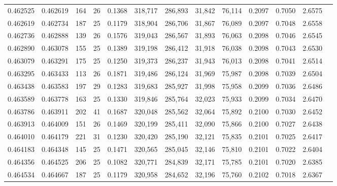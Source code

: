 \begin{tabular}{rrrrrrrrrrrrr}
0.462525 & 0.462619 &   164 &  26 &                                     0.1368 & 318,717 & 286,893 &  31,842 &  76,114 & 0.2097 & 0.7050 & 2.6575 \\
0.462619 & 0.462734 &   187 &  25 &                                     0.1179 & 318,904 & 286,706 &  31,867 &  76,089 & 0.2097 & 0.7048 & 2.6558 \\
0.462736 & 0.462888 &   139 &  26 &                                     0.1576 & 319,043 & 286,567 &  31,893 &  76,063 & 0.2098 & 0.7046 & 2.6545 \\
0.462890 & 0.463078 &   155 &  25 &                                     0.1389 & 319,198 & 286,412 &  31,918 &  76,038 & 0.2098 & 0.7043 & 2.6530 \\
0.463079 & 0.463291 &   175 &  25 &                                     0.1250 & 319,373 & 286,237 &  31,943 &  76,013 & 0.2098 & 0.7041 & 2.6514 \\
0.463295 & 0.463433 &   113 &  26 &                                     0.1871 & 319,486 & 286,124 &  31,969 &  75,987 & 0.2098 & 0.7039 & 2.6504 \\
0.463438 & 0.463583 &   197 &  29 &                                     0.1283 & 319,683 & 285,927 &  31,998 &  75,958 & 0.2099 & 0.7036 & 2.6486 \\
0.463589 & 0.463778 &   163 &  25 &                                     0.1330 & 319,846 & 285,764 &  32,023 &  75,933 & 0.2099 & 0.7034 & 2.6470 \\
0.463786 & 0.463911 &   202 &  41 &                                     0.1687 & 320,048 & 285,562 &  32,064 &  75,892 & 0.2100 & 0.7030 & 2.6452 \\
0.463913 & 0.464009 &   151 &  26 &                                     0.1469 & 320,199 & 285,411 &  32,090 &  75,866 & 0.2100 & 0.7027 & 2.6438 \\
0.464010 & 0.464179 &   221 &  31 &                                     0.1230 & 320,420 & 285,190 &  32,121 &  75,835 & 0.2101 & 0.7025 & 2.6417 \\
0.464183 & 0.464348 &   145 &  25 &                                     0.1471 & 320,565 & 285,045 &  32,146 &  75,810 & 0.2101 & 0.7022 & 2.6404 \\
0.464356 & 0.464525 &   206 &  25 &                                     0.1082 & 320,771 & 284,839 &  32,171 &  75,785 & 0.2101 & 0.7020 & 2.6385 \\
0.464534 & 0.464667 &   187 &  25 &                                     0.1179 & 320,958 & 284,652 &  32,196 &  75,760 & 0.2102 & 0.7018 & 2.6367 \\

\end{tabular}
